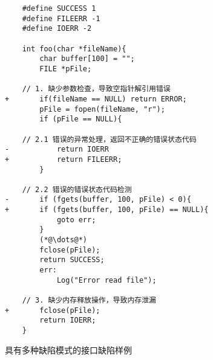 \begin{figure}[t]
	\centering
	\begin{minipage}[t]{0.8\linewidth}
\begin{lstlisting}
    #define SUCCESS 1
    #define FILEERR -1
    #define IOERR -2		

    int foo(char *fileName){
		char buffer[100] = "";
		FILE *pFile;

	// 1. 缺少参数检查，导致空指针解引用错误
+   	if(fileName == NULL) return ERROR;
		pFile = fopen(fileName, "r");
		if (pFile == NULL){

	// 2.1 错误的异常处理，返回不正确的错误状态代码
-   	    return IOERR
+   	    return FILEERR;
		}

	// 2.2 错误的错误状态代码检测
-   	if (fgets(buffer, 100, pFile) < 0){
+   	if (fgets(buffer, 100, pFile) == NULL){
			goto err;
		}
		(*@\dots@*)
		fclose(pFile);
		return SUCCESS; 
		err:
			Log("Error read file");

	// 3. 缺少内存释放操作，导致内存泄漏
+   	fclose(pFile);
		return IOERR;
	}
\end{lstlisting}
	\caption{
	具有多种缺陷模式的接口缺陷样例
	}
	\label{fig:2-4-example}
	\end{minipage}
\end{figure}